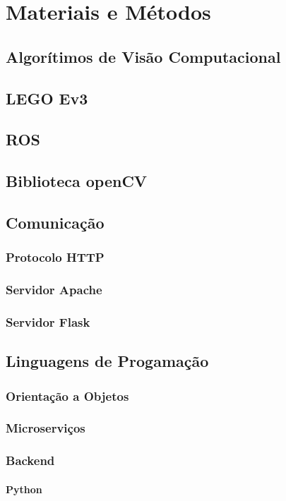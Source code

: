 \chapter{Materiais e Métodos}

\section{Algorítimos de Visão Computacional}
\section{LEGO Ev3}
\section{ROS}
\section{Biblioteca openCV}
\section{Comunicação}
\subsection{Protocolo HTTP}
\subsection{Servidor Apache}
\subsection{Servidor Flask}
\section{Linguagens de Progamação}
\subsection{Orientação a Objetos}
\subsection{Microserviços}
\subsection{Backend}
\subsubsection{Python}
